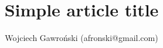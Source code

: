 ﻿\documentclass[11pt,a4paper]{article}
\title{Simple article title}
\author{Wojciech Gawroński (afronski@gmail.com)}
\begin{document}
	\maketitle
	\newpage

	\tableofcontents
	\newpage

\begin{thebibliography}{99}
\end{thebibliography}
\end{document}
